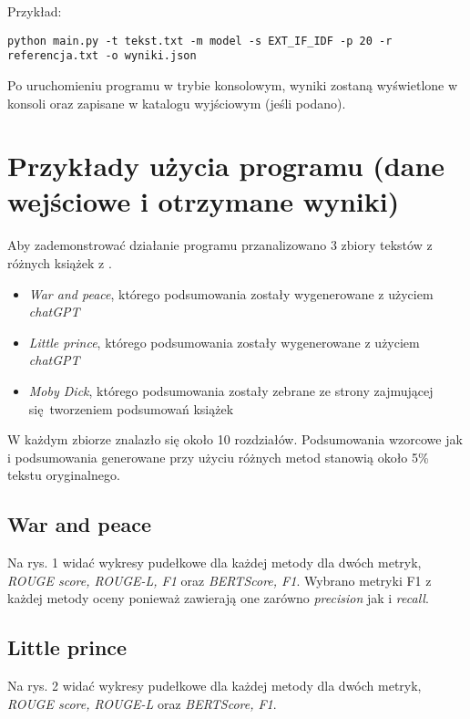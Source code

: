 \documentclass{article}
\begin{document}
Przykład:
\begin{lstlisting}
python main.py -t tekst.txt -m model -s EXT_IF_IDF -p 20 -r referencja.txt -o wyniki.json
\end{lstlisting}

Po uruchomieniu programu w trybie konsolowym, wyniki zostaną wyświetlone w konsoli oraz zapisane w katalogu wyjściowym (jeśli podano).

\section{Przykłady użycia programu (dane wejściowe i otrzymane wyniki)}
Aby zademonstrować działanie programu przanalizowano 3 zbiory tekstów z różnych książek z \cite{gutenberg}.
\begin{itemize}
	\item \textit{War and peace}, którego podsumowania zostały wygenerowane z użyciem \textit{chatGPT}
	\item \textit{Little prince}, którego podsumowania zostały wygenerowane z użyciem \textit{chatGPT}
	\item \textit{Moby Dick}, którego podsumowania zostały zebrane ze strony zajmującej się tworzeniem podsumowań
		książek \cite{sparknotes}
\end{itemize}
W każdym zbiorze znalazło się około 10 rozdziałów. Podsumowania wzorcowe jak i podsumowania generowane
przy użyciu różnych metod stanowią około 5\% tekstu oryginalnego.

\subsection{War and peace}
Na rys. 1 widać wykresy pudełkowe dla każdej metody dla dwóch metryk, \textit{ROUGE score, ROUGE-L, F1}
oraz \textit{BERTScore, F1}. Wybrano metryki F1 z każdej metody oceny ponieważ zawierają one zarówno
\textit{precision} jak i \textit{recall}.


\subsection{Little prince}
Na rys. 2 widać wykresy pudełkowe dla każdej metody dla dwóch metryk, \textit{ROUGE score, ROUGE-L} oraz 
\textit{BERTScore, F1}.
\end{document}
